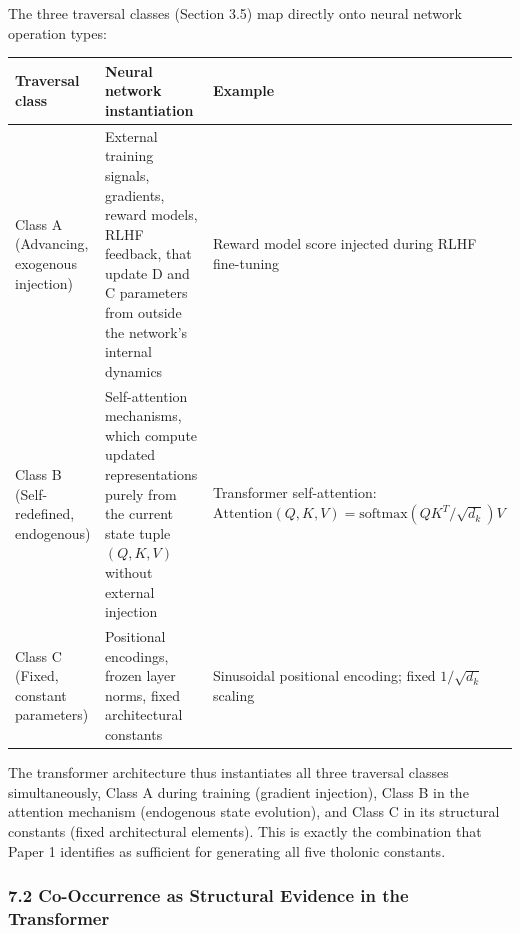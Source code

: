 \documentclass[
  11pt,
  letterpaper,
]{article}
\begin{document}
The three traversal classes (Section 3.5) map directly onto neural
network operation types:

\begin{longtable}[]{@{}
  >{\raggedright\arraybackslash}p{}
  >{\raggedright\arraybackslash}p{}
  >{\raggedright\arraybackslash}p{}@{}}
\toprule\noalign{}
\begin{minipage}[b]{\linewidth}\raggedright
Traversal class
\end{minipage} & \begin{minipage}[b]{\linewidth}\raggedright
Neural network instantiation
\end{minipage} & \begin{minipage}[b]{\linewidth}\raggedright
Example
\end{minipage} \\
\midrule\noalign{}
\endhead
\bottomrule\noalign{}
\endlastfoot
Class A (Advancing, exogenous injection) & External training signals,
gradients, reward models, RLHF feedback, that update D and C parameters
from outside the network's internal dynamics & Reward model score
injected during RLHF fine-tuning \\
Class B (Self-redefined, endogenous) & Self-attention mechanisms, which
compute updated representations purely from the current state tuple
\((Q, K, V)\) without external injection & Transformer self-attention:
\(\text{Attention}(Q,K,V) = \text{softmax}(QK^T/\sqrt{d_k})V\) \\
Class C (Fixed, constant parameters) & Positional encodings, frozen
layer norms, fixed architectural constants & Sinusoidal positional
encoding; fixed \(1/\sqrt{d_k}\) scaling \\
\end{longtable}

The transformer architecture thus instantiates all three traversal
classes simultaneously, Class A during training (gradient injection),
Class B in the attention mechanism (endogenous state evolution), and
Class C in its structural constants (fixed architectural elements). This
is exactly the combination that Paper 1 identifies as sufficient for
generating all five tholonic constants.

\subsubsection{7.2 Co-Occurrence as Structural Evidence in the
Transformer}\label{co-occurrence-as-structural-evidence-in-the-transformer}
\end{document}
